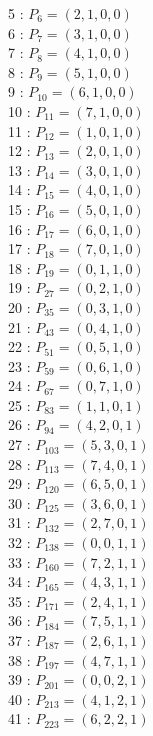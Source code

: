 \documentclass{article}
\begin{document}
{\begin{multicols}{3}
5 : $P_{6}=( 2, 1, 0, 0 )$\\
6 : $P_{7}=( 3, 1, 0, 0 )$\\
7 : $P_{8}=( 4, 1, 0, 0 )$\\
8 : $P_{9}=( 5, 1, 0, 0 )$\\
9 : $P_{10}=( 6, 1, 0, 0 )$\\
10 : $P_{11}=( 7, 1, 0, 0 )$\\
11 : $P_{12}=( 1, 0, 1, 0 )$\\
12 : $P_{13}=( 2, 0, 1, 0 )$\\
13 : $P_{14}=( 3, 0, 1, 0 )$\\
14 : $P_{15}=( 4, 0, 1, 0 )$\\
15 : $P_{16}=( 5, 0, 1, 0 )$\\
16 : $P_{17}=( 6, 0, 1, 0 )$\\
17 : $P_{18}=( 7, 0, 1, 0 )$\\
18 : $P_{19}=( 0, 1, 1, 0 )$\\
19 : $P_{27}=( 0, 2, 1, 0 )$\\
20 : $P_{35}=( 0, 3, 1, 0 )$\\
21 : $P_{43}=( 0, 4, 1, 0 )$\\
22 : $P_{51}=( 0, 5, 1, 0 )$\\
23 : $P_{59}=( 0, 6, 1, 0 )$\\
24 : $P_{67}=( 0, 7, 1, 0 )$\\
25 : $P_{83}=( 1, 1, 0, 1 )$\\
26 : $P_{94}=( 4, 2, 0, 1 )$\\
27 : $P_{103}=( 5, 3, 0, 1 )$\\
28 : $P_{113}=( 7, 4, 0, 1 )$\\
29 : $P_{120}=( 6, 5, 0, 1 )$\\
30 : $P_{125}=( 3, 6, 0, 1 )$\\
31 : $P_{132}=( 2, 7, 0, 1 )$\\
32 : $P_{138}=( 0, 0, 1, 1 )$\\
33 : $P_{160}=( 7, 2, 1, 1 )$\\
34 : $P_{165}=( 4, 3, 1, 1 )$\\
35 : $P_{171}=( 2, 4, 1, 1 )$\\
36 : $P_{184}=( 7, 5, 1, 1 )$\\
37 : $P_{187}=( 2, 6, 1, 1 )$\\
38 : $P_{197}=( 4, 7, 1, 1 )$\\
39 : $P_{201}=( 0, 0, 2, 1 )$\\
40 : $P_{213}=( 4, 1, 2, 1 )$\\
41 : $P_{223}=( 6, 2, 2, 1 )$\\

\end{multicols}}
\end{document}
